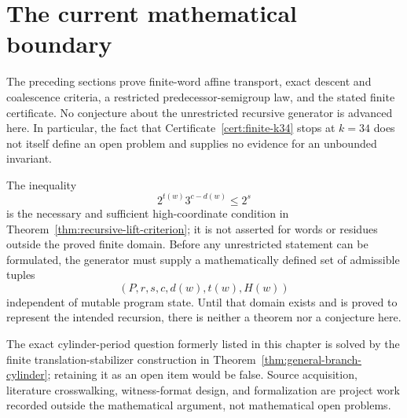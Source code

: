 \section{The current mathematical boundary}

The preceding sections prove finite-word affine transport, exact descent and
coalescence criteria, a restricted predecessor-semigroup law, and the stated
finite certificate. No conjecture about the unrestricted recursive generator
is advanced here. In particular, the fact that
Certificate~\ref{cert:finite-k34} stops at $k=34$ does not itself define an
open problem and supplies no evidence for an unbounded invariant.

The inequality
\[
 2^{t(w)}3^{c-d(w)}\le 2^s
\]
is the necessary and sufficient high-coordinate condition in
Theorem~\ref{thm:recursive-lift-criterion}; it is not asserted for words or
residues outside the proved finite domain. Before any unrestricted statement
can be formulated, the generator must supply a mathematically defined set of
admissible tuples
\[
 (P,r,s,c,d(w),t(w),H(w))
\]
independent of mutable program state. Until that domain exists and is proved
to represent the intended recursion, there is neither a theorem nor a
conjecture here.

The exact cylinder-period question formerly listed in this chapter is solved
by the finite translation-stabilizer construction in
Theorem~\ref{thm:general-branch-cylinder}; retaining it as an open item would
be false. Source acquisition, literature crosswalking, witness-format design,
and formalization are project work recorded outside the mathematical argument,
not mathematical open problems.
